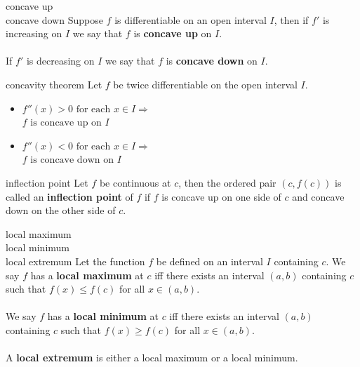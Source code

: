 \documentclass[avery5371,grid]{flashcards}
\begin{document}
\begin{flashcard}[Definition]{concave up\\concave down}
Suppose $f$ is differentiable on an open interval $I$, then
if $f'$ is increasing on $I$ we say that $f$ is \textbf{concave up} on $I$.
\\
\\
If $f'$ is decreasing on $I$ we say that $f$ is \textbf{concave down} on $I$. 
\end{flashcard}

\begin{flashcard}[Theorem]{concavity theorem}
Let $f$ be twice differentiable on the open interval $I$.
\begin{itemize}
\item $f''(x)>0 \text{ for each } x \in I \Rightarrow$\\
$f \text{ is concave up on } I$ 
\item $f''(x)<0 \text{ for each } x \in I \Rightarrow$\\
$f \text{ is concave down on } I$ 
\end{itemize}
\end{flashcard}

\begin{flashcard}[Definition]{inflection point}
Let $f$ be continuous at $c$, then the ordered pair $(c,f(c))$ is
called an \textbf{inflection point} of $f$ if $f$ is concave up on
one side of $c$ and concave down on the other side of $c$.
\end{flashcard}

\begin{flashcard}[definition]{local maximum\\local minimum\\local extremum}
Let the function $f$ be defined on an interval $I$ containing $c$.  We say
$f$ has a \textbf{local maximum} at $c$ iff there exists an
interval $(a,b)$ containing $c$ such that $f(x) \leq f(c)$ for all $x \in (a,b)$.
\\ \\
We say $f$ has a \textbf{local minimum} at $c$ iff there exists an
interval $(a,b)$ containing $c$ such that $f(x) \geq f(c)$ for all $x \in (a,b)$.
\\ \\
A \textbf{local extremum} is either a local maximum or a local
minimum.
\end{flashcard}
\end{document}

